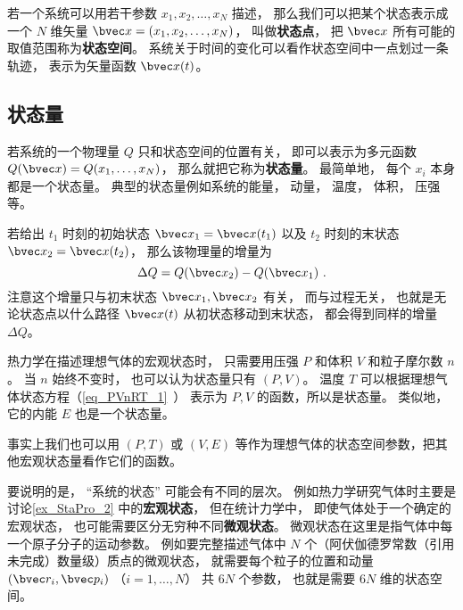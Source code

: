 

若一个系统可以用若干参数 $x_1, x_2,  \dots, x_N$ 描述， 那么我们可以把某个状态表示成一个 $N$ 维矢量 $\bvec x = (x_1, x_2, \dots, x_N)$， 叫做\textbf{状态点}， 把 $\bvec x$ 所有可能的取值范围称为\textbf{状态空间}。 系统关于时间的变化可以看作状态空间中一点划过一条轨迹， 表示为矢量函数 $\bvec x(t)$。

\subsection{状态量}
若系统的一个物理量 $Q$ 只和状态空间的位置有关， 即可以表示为多元函数 $Q(\bvec x) = Q(x_1, \dots, x_N)$， 那么就把它称为\textbf{状态量}。 最简单地， 每个 $x_i$ 本身都是一个状态量。 典型的状态量例如系统的能量， 动量， 温度， 体积， 压强等。

若给出 $t_1$ 时刻的初始状态 $\bvec x_1 = \bvec x(t_1)$ 以及 $t_2$ 时刻的末状态 $\bvec x_2 = \bvec x(t_2)$， 那么该物理量的增量为
\begin{equation}
\Delta Q = Q(\bvec x_2) - Q(\bvec x_1)~.
\end{equation}
注意这个增量只与初末状态 $\bvec x_1,\bvec x_2$ 有关， 而与过程无关， 也就是无论状态点以什么路径 $\bvec x(t)$ 从初状态移动到末状态， 都会得到同样的增量 $\Delta Q$。

\begin{example}{}\label{ex_StaPro_2}
热力学在描述理想气体的宏观状态时， 只需要用压强 $P$ 和体积 $V$ 和粒子摩尔数 $n$。 当 $n$ 始终不变时， 也可以认为状态量只有 $(P,V)$。 温度 $T$ 可以根据理想气体状态方程（\autoref{eq_PVnRT_1}~） 表示为 $P,V$ 的函数，所以是状态量。 类似地， 它的内能 $E$ 也是一个状态量。

事实上我们也可以用 $(P,T)$ 或 $(V,E)$ 等作为理想气体的状态空间参数，把其他宏观状态量看作它们的函数。
\end{example}

要说明的是， “系统的状态” 可能会有不同的层次。 例如热力学研究气体时主要是讨论\autoref{ex_StaPro_2} 中的\textbf{宏观状态}， 但在统计力学中， 即使气体处于一个确定的宏观状态， 也可能需要区分无穷种不同\textbf{微观状态}。 微观状态在这里是指气体中每一个原子分子的运动参数。 例如要完整描述气体中 $N$ 个（阿伏伽德罗常数（引用未完成）数量级）质点的微观状态， 就需要每个粒子的位置和动量 $(\bvec r_i, \bvec p_i)$ （$i=1,\dots,N$） 共 $6N$ 个参数， 也就是需要 $6N$ 维的状态空间。

